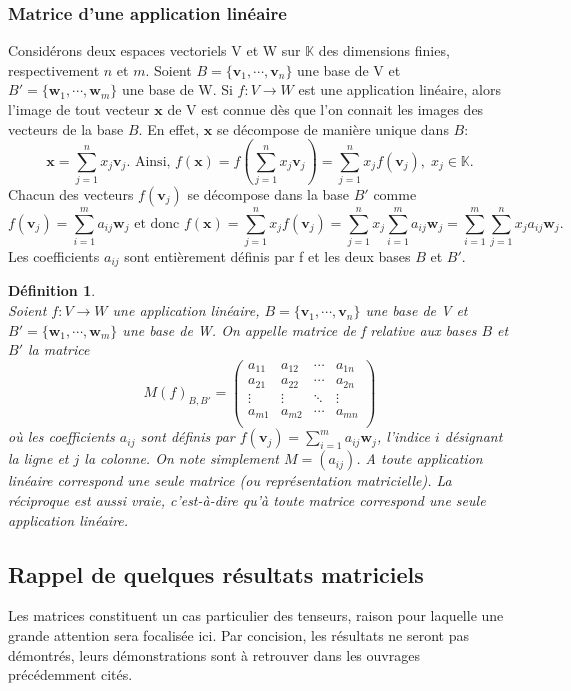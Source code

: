 \documentclass[11pt,a4paper,oneside]{book}
\newtheorem{defi}{Définition}[chapter]
\def\K{\mathbb K}
\def\v{\mathbf v}
\def\x{\mathbf x}
\def\w{\mathbf w}
\begin{document}
\subsubsection{Matrice d'une application linéaire}\label{matrice}
Considérons deux espaces vectoriels V et W sur $ \K $ des dimensions finies, respectivement $ n $ et $ m $. Soient $ B=\{\v_{1},\cdots,\v_{n}\} $ une base de V et $ B'=\{\w_{1},\cdots,\w_{m}\} $ une base de W. Si $ f:V\rightarrow W $ est une application linéaire, alors l'image de tout vecteur $ \x $ de V est connue dès que l'on connait les images des vecteurs de la base $ B $. En effet, $ \x $ se décompose de manière unique dans $ B $: 
$$\x=\sum_{j=1}^{n}x_{j}\v_{j}. \text{ Ainsi, } f(\x)=f\left(\sum_{j=1}^{n}x_{j}\v_{j}\right)=\sum_{j=1}^{n}x_{j}f(\v_{j}),\;x_{j}\in\K.$$ Chacun des vecteurs $ f(\v_{j}) $ se décompose dans la base $ B' $ comme
$$f(\v_{j})=\sum_{i=1}^{m}a_{ij}\w_{j} \text{ et donc } f(\x)=\sum_{j=1}^{n}x_{j}f(\v_{j})=\sum_{j=1}^{n}x_{j}\sum_{i=1}^{m}a_{ij}\w_{j}=\sum_{i=1}^{m}\sum_{j=1}^{n}x_{j}a_{ij}\w_{j}. $$ Les coefficients $ a_{ij}$ sont entièrement définis par f et les deux bases $B $ et $ B' $.
\begin{defi}
\emph{\\}
Soient $ f:V\rightarrow W $ une application linéaire, $ B=\{\v_{1},\cdots,\v_{n}\} $ une base de V et $ B'=\{\w_{1},\cdots,\w_{m}\} $ une base de W. On appelle matrice de f relative aux bases $B$ et $B'$ la matrice 
\begin{equation}\label{matrix}
M(f)_{B,B'}=\begin{pmatrix}
	a_{11}&	a_{12}&\cdots&a_{1n}\\
	a_{21}&	a_{22}&\cdots&a_{2n}\\
	\vdots&\vdots&\ddots&\vdots\\
	a_{m1}&	a_{m2}&\cdots&a_{mn}\\
\end{pmatrix}
\end{equation}
où les coefficients $ a_{ij}$ sont définis par $ f(\v_{j})=\sum_{i=1}^{m}a_{ij}\w_{j} $, l'indice $ i $ désignant la ligne et $ j $ la colonne. On note simplement $ M=(a_{ij}) $. A toute application linéaire correspond une seule matrice (ou représentation matricielle). La réciproque est aussi vraie, c’est-à-dire qu’à toute matrice correspond une seule application linéaire.
\end{defi}
\subsection{Rappel de quelques résultats matriciels}
Les matrices constituent un cas particulier des tenseurs, raison pour laquelle une grande attention sera focalisée ici. Par concision, les résultats ne seront pas démontrés, leurs démonstrations sont à retrouver dans les ouvrages précédemment cités.
\end{document}
